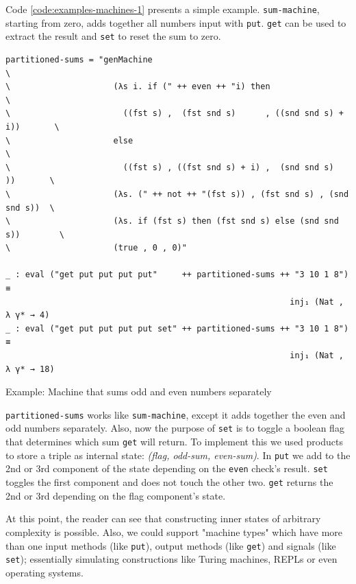 Code \ref{code:examples-machines-1} presents a simple example. \verb$sum-machine$, starting from zero, adds together all numbers input with \verb$put$. \verb$get$ can be used to extract the result and \verb$set$ to reset the sum to zero.

\begin{listing}[H]
\begin{verbatim}
partitioned-sums = "genMachine                                                  \
\                     (λs i. if (" ++ even ++ "i) then                          \
\                       ((fst s) ,  (fst snd s)      , ((snd snd s) + i))       \
\                     else                                                      \
\                       ((fst s) , ((fst snd s) + i) ,  (snd snd s)    ))       \
\                     (λs. (" ++ not ++ "(fst s)) , (fst snd s) , (snd snd s))  \
\                     (λs. if (fst s) then (fst snd s) else (snd snd s))        \
\                     (true , 0 , 0)"

_ : eval ("get put put put put"     ++ partitioned-sums ++ "3 10 1 8") ≡
                                                          inj₁ (Nat , λ γ* → 4)
_ : eval ("get put put put put set" ++ partitioned-sums ++ "3 10 1 8") ≡
                                                          inj₁ (Nat , λ γ* → 18)
\end{verbatim}
\caption{Example: Machine that sums odd and even numbers separately}
\label{code:examples-machines-2}
\end{listing}

\verb$partitioned-sums$ works like \verb$sum-machine$, except it adds together the even and odd numbers separately. Also, now the purpose of \verb$set$ is to toggle a boolean flag that determines which sum \verb$get$ will return. To implement this we used products to store a triple as internal state: \textit{(flag, odd-sum, even-sum)}. In \verb$put$ we add to the 2nd or 3rd component of the state depending on the \verb$even$ check's result. \verb$set$ toggles the first component and does not touch the other two. \verb$get$ returns the 2nd or 3rd depending on the flag component's state.

At this point, the reader can see that constructing inner states of arbitrary complexity is possible. Also, we could support "machine types" which have more than one input methods (like \verb$put$), output methods (like \verb$get$) and signals (like \verb$set$); essentially simulating constructions like Turing machines, REPLs or even operating systems.

